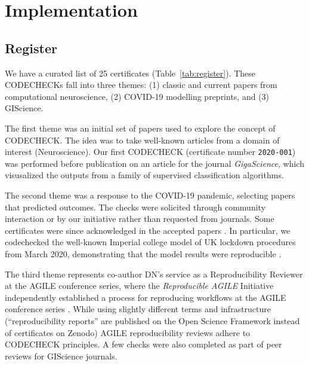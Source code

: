 \documentclass[12pt]{article}
\begin{document}
\section*{Implementation}\label{implementation}

\subsection*{Register}\label{register}

We have a curated list of 25 certificates (Table~\ref{tab:register}).
These CODECHECKs fall into three themes: (1) classic and current
papers from computational neuroscience, (2) COVID-19 modelling
preprints, and (3) GIScience.

The first theme was an initial set of papers used to explore the
concept of CODECHECK.  The idea was to take well-known articles from a
domain of interest (Neuroscience).  Our first CODECHECK (certificate
number \texttt{2020-001}) was performed before publication on an
article for the journal \emph{GigaScience}, which visusalized the
outputs from a family of supervised classification algorithms.

The second theme was a response to the COVID-19 pandemic, selecting
papers that predicted outcomes. The checks were solicited through
community interaction or by our initiative rather than requested from
journals.  Some certificates were since acknowledged in the accepted
papers \cite{Davies2020-vj,kucharski_effectiveness_2020}. In
particular, we codechecked the well-known Imperial college model of UK
lockdown procedures from March 2020,
demonstrating that the model results were reproducible
\cite{Chawla2020-hi,cert-2020-010}.

The third theme represents co-author DN's service as a Reproducibility
Reviewer at the AGILE conference series, where the \emph{Reproducible
  AGILE} Initiative \cite{reproducible_agile} independently
established a process for reproducing workflows at the AGILE
conference series \cite{nust_improving_2020}.  While using slightly
different terms and infrastructure (``reproducibility reports'' are
published on the Open Science Framework instead of certificates
on Zenodo) AGILE reproducibility reviews adhere to CODECHECK
principles.  A few checks were also completed as part of peer reviews
for GIScience journals.
\end{document}
